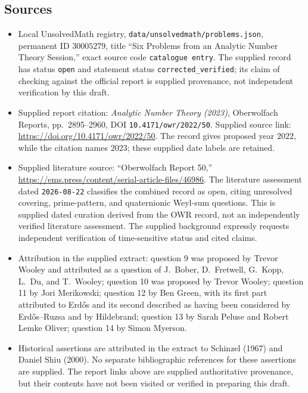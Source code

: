 \documentclass[11pt]{article}
\begin{document}
\subsection{Sources}
\begin{itemize}
\item Local UnsolvedMath registry, \texttt{data/unsolvedmath/problems.json}, permanent ID \(30005279\), title ``Six Problems from an Analytic Number Theory Session,'' exact source code \texttt{catalogue entry}. The supplied record has status \texttt{open} and statement status \texttt{corrected\_verified}; its claim of checking against the official report is supplied provenance, not independent verification by this draft.
\item Supplied report citation: \emph{Analytic Number Theory (2023)}, Oberwolfach Reports, pp.~2895--2960, DOI \texttt{10.4171/owr/2022/50}. Supplied source link: \url{https://doi.org/10.4171/owr/2022/50}. The record gives proposed year \(2022\), while the citation names \(2023\); these supplied date labels are retained.
\item Supplied literature source: ``Oberwolfach Report 50,'' \url{https://ems.press/content/serial-article-files/46986}. The literature assessment dated \texttt{2026-08-22} classifies the combined record as open, citing unresolved covering, prime-pattern, and quaternionic Weyl-sum questions. This is supplied dated curation derived from the OWR record, not an independently verified literature assessment. The supplied background expressly requests independent verification of time-sensitive status and cited claims.
\item Attribution in the supplied extract: question 9 was proposed by Trevor Wooley and attributed as a question of J.~Bober, D.~Fretwell, G.~Kopp, L.~Du, and T.~Wooley; question 10 was proposed by Trevor Wooley; question 11 by Jori Merikowski; question 12 by Ben Green, with its first part attributed to Erd\H{o}s and its second described as having been considered by Erd\H{o}s--Ruzsa and by Hildebrand; question 13 by Sarah Peluse and Robert Lemke Oliver; question 14 by Simon Myerson.
\item Historical assertions are attributed in the extract to Schinzel (1967) and Daniel Shiu (2000). No separate bibliographic references for these assertions are supplied. The report links above are supplied authoritative provenance, but their contents have not been visited or verified in preparing this draft.
\end{itemize}
\end{document}

